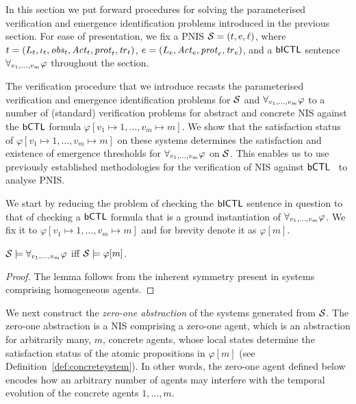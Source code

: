 In this section we put forward procedures for solving the parameterised
verification and emergence identification problems introduced in the previous
section. For ease of presentation,  we fix a PNIS $\mathcal S = \left ( t, e, \ell \right )$,
where ${t} = \left ( L_{t}, \iota_{t}, \mathit{obs}_{t}, \mathit{Act}_{t}, \mathit{prot}_{t}, \mathit{tr}_{t}  \right )$,
${e} = \left ( L_{e}, \mathit{Act}_{e}, \mathit{prot}_{e}, \mathit{tr}_{e}  \right )$, and a $\sf{bICTL}$ sentence
$\forall_{v_1,\ldots,v_m} \varphi$ throughout the section. 

The verification procedure that we introduce recasts the
parameterised verification and emergence identification problems for $\mathcal S$
and $\forall_{v_1,\ldots,v_m} \varphi$ to a number of (standard) verification problems for abstract
and concrete NIS against the $\sf{bCTL}$ formula
$\varphi[v_1 \mapsto 1, \ldots, v_m \mapsto m]$.  We show that the satisfaction
status of $\varphi[v_1 \mapsto 1, \ldots, v_m \mapsto m]$ on these systems
determines the satisfaction and existence of emergence thresholds  for 
$\forall_{v_1,\ldots,v_m} \varphi$ on $\mathcal S$. This enables us to use previously established
methodologies for the verification of NIS against $\sf{bCTL}$~\cite{Akintunde+20b}
to analyse PNIS.


We start by reducing the problem of checking the $\sf{bICTL}$ sentence in
question to that of checking a $\sf{bCTL}$ formula that is a ground
instantiation of $\forall_{v_1,\ldots,v_m} \varphi$.  We fix it to
$\varphi[v_1 \mapsto 1, \ldots, v_m \mapsto m]$ and for brevity denote it 
as $\varphi[m]$.


\begin{lemma}
\label{lemma:symmetry}
$\mathcal S \models \forall_{v_1,\ldots,v_m} \varphi$ iff $\mathcal S \models \varphi[m]$.
\end{lemma}
\begin{proof}
The lemma follows from the inherent symmetry present in systems comprising
homogeneous agents.
\end{proof}

We next construct the \emph{zero-one abstraction} of the systems generated from
$\mathcal S$. The zero-one abstraction is a NIS comprising a zero-one agent, which
is an abstraction for arbitrarily many, $m$, concrete agents, whose local
states determine the satisfaction status of the atomic propositions in
$\varphi[m]$ (see Definition~\ref{def:concreteystem}). %
In other words, the zero-one agent defined below encodes how an arbitrary
number of agents may interfere with the temporal evolution of the concrete
agents $1, \ldots, m$.

